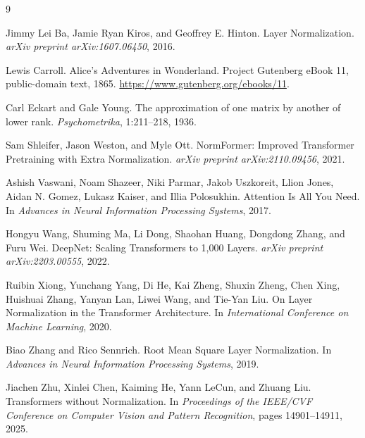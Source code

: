 \documentclass[11pt]{article}
\begin{document}


\begin{thebibliography}{9}

Jimmy Lei Ba, Jamie Ryan Kiros, and Geoffrey E. Hinton.
\newblock Layer Normalization.
\newblock \emph{arXiv preprint arXiv:1607.06450}, 2016.

Lewis Carroll.
\newblock Alice's Adventures in Wonderland.
\newblock Project Gutenberg eBook 11, public-domain text, 1865.
\newblock \url{https://www.gutenberg.org/ebooks/11}.

Carl Eckart and Gale Young.
\newblock The approximation of one matrix by another of lower rank.
\newblock \emph{Psychometrika}, 1:211--218, 1936.

Sam Shleifer, Jason Weston, and Myle Ott.
\newblock NormFormer: Improved Transformer Pretraining with Extra Normalization.
\newblock \emph{arXiv preprint arXiv:2110.09456}, 2021.

Ashish Vaswani, Noam Shazeer, Niki Parmar, Jakob Uszkoreit,
Llion Jones, Aidan N. Gomez, Lukasz Kaiser, and Illia Polosukhin.
\newblock Attention Is All You Need.
\newblock In \emph{Advances in Neural Information Processing Systems}, 2017.

Hongyu Wang, Shuming Ma, Li Dong, Shaohan Huang, Dongdong Zhang, and Furu Wei.
\newblock DeepNet: Scaling Transformers to 1,000 Layers.
\newblock \emph{arXiv preprint arXiv:2203.00555}, 2022.

Ruibin Xiong, Yunchang Yang, Di He, Kai Zheng, Shuxin Zheng, Chen Xing,
Huishuai Zhang, Yanyan Lan, Liwei Wang, and Tie-Yan Liu.
\newblock On Layer Normalization in the Transformer Architecture.
\newblock In \emph{International Conference on Machine Learning}, 2020.

Biao Zhang and Rico Sennrich.
\newblock Root Mean Square Layer Normalization.
\newblock In \emph{Advances in Neural Information Processing Systems}, 2019.

Jiachen Zhu, Xinlei Chen, Kaiming He, Yann LeCun, and Zhuang Liu.
\newblock Transformers without Normalization.
\newblock In \emph{Proceedings of the IEEE/CVF Conference on Computer Vision and Pattern Recognition},
pages 14901--14911, 2025.

\end{thebibliography}
\end{document}
